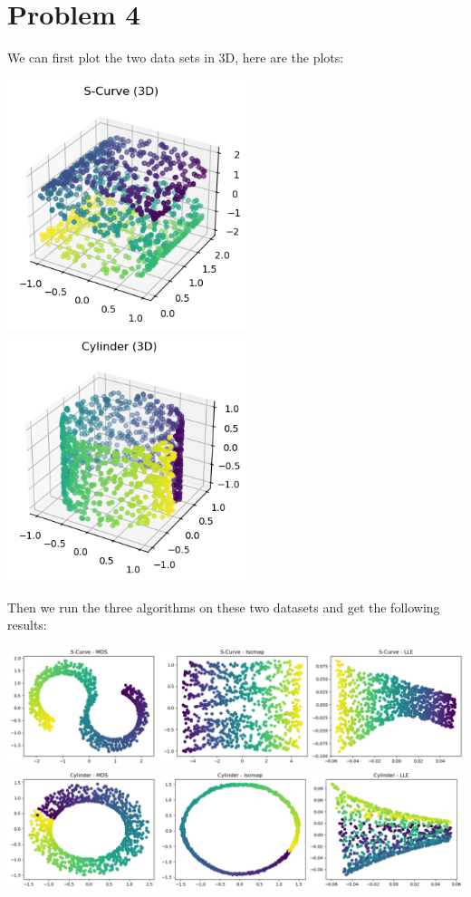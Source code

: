 \documentclass[11pt]{scrartcl}
\begin{document}
\newpage

\section{Problem 4}

We can first plot the two data sets in 3D, here are the plots: \begin{center}
    \includegraphics[width=7cm]{hw1-img/hw1-p4-1.png}
    \includegraphics[width=7cm]{hw1-img/hw1-p4-2.png}
\end{center}
Then we run the three algorithms on these two datasets and get the following results: \begin{center}
    \includegraphics[width=14cm]{hw1-img/hw1-p4-3.png}
    \includegraphics[width=14cm]{hw1-img/hw1-p4-4.png}
\end{center}
\end{document}
